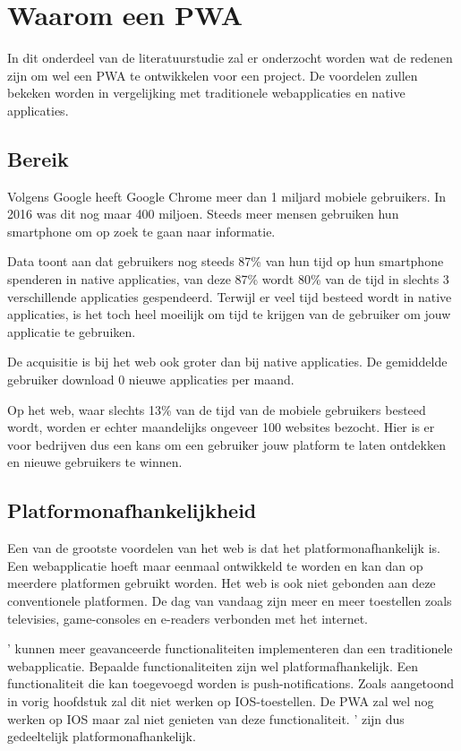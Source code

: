 \section{Waarom een PWA}

In dit onderdeel van de literatuurstudie zal er onderzocht worden wat de redenen zijn om wel een PWA te ontwikkelen voor een project. De voordelen zullen bekeken worden in vergelijking met traditionele webapplicaties en native applicaties.
\autocite{TandelSunil2018}


\subsection{Bereik}
	Volgens Google heeft Google Chrome meer dan 1 miljard mobiele gebruikers. In 2016 was dit nog maar 400 miljoen. Steeds meer mensen gebruiken hun smartphone om op zoek te gaan naar informatie. 
	\autocite{Nath2017}
	
	Data toont aan dat gebruikers nog steeds 87\% van hun tijd op hun smartphone spenderen in native applicaties, van deze 87\% wordt 80\% van de tijd in slechts 3 verschillende applicaties gespendeerd. Terwijl er veel tijd besteed wordt in native applicaties, is het toch heel moeilijk om tijd te krijgen van de gebruiker om jouw applicatie te gebruiken.
	
	De acquisitie is bij het web ook groter dan bij native applicaties. De gemiddelde gebruiker download 0 nieuwe applicaties per maand. 
	
	Op het web, waar slechts 13\% van de tijd van de mobiele gebruikers besteed wordt, worden er echter maandelijks ongeveer 100 websites bezocht. Hier is er voor bedrijven dus een kans om een gebruiker jouw platform te laten ontdekken en nieuwe gebruikers te winnen.
	\autocite{GoogleChromeDevelopers2017}
	

\subsection{Platformonafhankelijkheid }
	Een van de grootste voordelen van het web is dat het platformonafhankelijk is. Een webapplicatie hoeft maar eenmaal ontwikkeld te worden en kan dan op meerdere platformen gebruikt worden. Het web is ook niet gebonden aan deze conventionele platformen. De dag van vandaag zijn meer en meer toestellen zoals televisies, game-consoles en e-readers verbonden met het internet. 
	
	' kunnen meer geavanceerde functionaliteiten implementeren dan een traditionele webapplicatie. Bepaalde functionaliteiten zijn wel platformafhankelijk. Een functionaliteit die kan toegevoegd worden is push-notifications. Zoals aangetoond in vorig hoofdstuk zal dit niet werken op IOS-toestellen. De PWA zal wel nog werken op IOS maar zal niet genieten van deze functionaliteit. ' zijn dus gedeeltelijk platformonafhankelijk.
	
